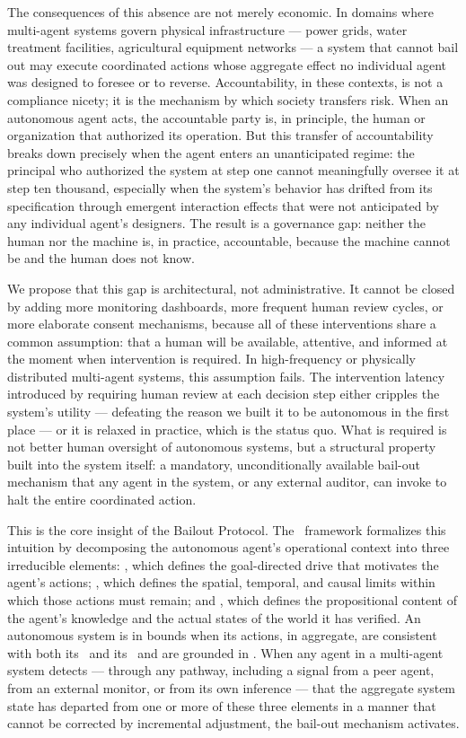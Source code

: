 The consequences of this absence are not merely economic. In domains where multi-agent systems govern physical infrastructure — power grids, water treatment facilities, agricultural equipment networks — a system that cannot bail out may execute coordinated actions whose aggregate effect no individual agent was designed to foresee or to reverse. Accountability, in these contexts, is not a compliance nicety; it is the mechanism by which society transfers risk. When an autonomous agent acts, the accountable party is, in principle, the human or organization that authorized its operation. But this transfer of accountability breaks down precisely when the agent enters an unanticipated regime: the principal who authorized the system at step one cannot meaningfully oversee it at step ten thousand, especially when the system's behavior has drifted from its specification through emergent interaction effects that were not anticipated by any individual agent's designers. The result is a governance gap: neither the human nor the machine is, in practice, accountable, because the machine cannot be and the human does not know.

We propose that this gap is architectural, not administrative. It cannot be closed by adding more monitoring dashboards, more frequent human review cycles, or more elaborate consent mechanisms, because all of these interventions share a common assumption: that a human will be available, attentive, and informed at the moment when intervention is required. In high-frequency or physically distributed multi-agent systems, this assumption fails. The intervention latency introduced by requiring human review at each decision step either cripples the system's utility — defeating the reason we built it to be autonomous in the first place — or it is relaxed in practice, which is the status quo. What is required is not better human oversight of autonomous systems, but a structural property built into the system itself: a mandatory, unconditionally available bail-out mechanism that any agent in the system, or any external auditor, can invoke to halt the entire coordinated action.

This is the core insight of the Bailout Protocol. The \bxthree\ framework formalizes this intuition by decomposing the autonomous agent's operational context into three irreducible elements: \purpose, which defines the goal-directed drive that motivates the agent's actions; \bounds, which defines the spatial, temporal, and causal limits within which those actions must remain; and \fact, which defines the propositional content of the agent's knowledge and the actual states of the world it has verified. An autonomous system is in bounds when its actions, in aggregate, are consistent with both its \purpose\ and its \bounds\ and are grounded in \fact. When any agent in a multi-agent system detects — through any pathway, including a signal from a peer agent, from an external monitor, or from its own inference — that the aggregate system state has departed from one or more of these three elements in a manner that cannot be corrected by incremental adjustment, the bail-out mechanism activates.

